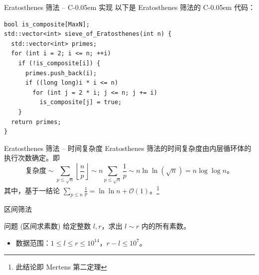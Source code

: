 \documentclass{../pkslide}
\newcommand{\Cpp}{\texorpdfstring{C\kern-0.05em\protect\raisebox{.35ex}{\textsmaller[2]{+\kern-0.05em+}}}{C++}}
\begin{document}
\begin{frame}[fragile]{Eratosthenes 筛法 -- \Cpp{} 实现}
  以下是 Eratosthenes 筛法的 \Cpp{} 代码：
  
\begin{verbatim}
bool is_composite[MaxN];
std::vector<int> sieve_of_Eratosthenes(int n) {
  std::vector<int> primes;
  for (int i = 2; i <= n; ++i)
    if (!is_composite[i]) {
      primes.push_back(i);
      if ((long long)i * i <= n)
        for (int j = 2 * i; j <= n; j += i)
          is_composite[j] = true;
    }
  return primes;
}
\end{verbatim}
  
\end{frame}

\begin{frame}{Eratosthenes 筛法 -- 时间复杂度}
  Eratosthenes 筛法的时间复杂度由内层循环体的执行次数确定。即%
  \[%
    \text{复杂度} \sim \sum_{p \le \sqrt{n}} \left\lfloor \frac{n}{p} \right\rfloor \sim n \sum_{p \le \sqrt{n}} \frac{1}{p} \sim n \ln \ln \!\left( \sqrt{n} \right) = n \log \log n \text{。}
  \]%
  其中，基于一结论 $\displaystyle \sum_{p \le n} \frac{1}{p} = \ln \ln n + \mathcal O (1)$。\footnote{此结论即 Mertens 第二定理}
  
\end{frame}

\begin{frame}{区间筛法}
  \begin{block}{问题 (区间求素数)}
    给定整数 $l, r$，求出 $l \sim r$ 内的所有素数。
    
    \begin{itemize}
      \item[\textbullet] 数据范围：$1 \le l \le r \le {10}^{14}$，$r - l \le {10}^7$。
    \end{itemize}
  \end{block}
  
\end{frame}
\end{document}
